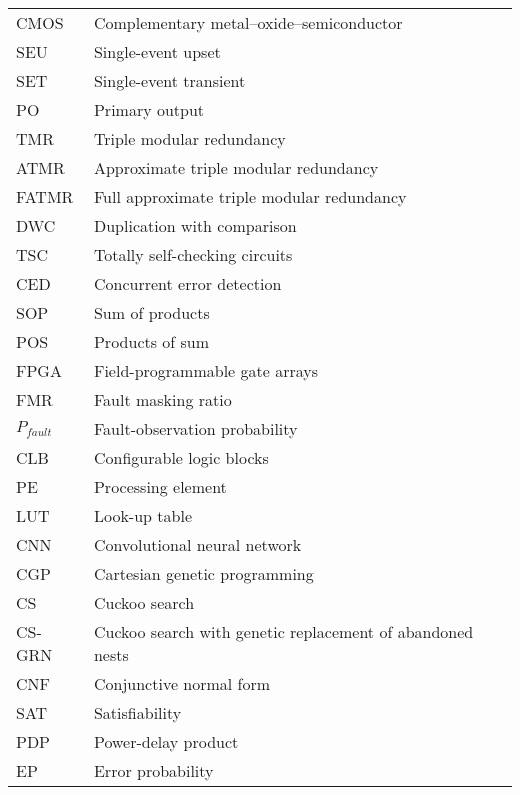 \begin{table}[h!]
    \captionsetup{labelformat=empty}
    \begin{tabular}{ll} %
      CMOS				&			Complementary metal–oxide–semiconductor \\
	  SEU			    &		    Single-event upset\\
	  SET		    	&			Single-event transient\\
	  PO			    &			Primary output \\			
      TMR				&			Triple modular redundancy\\
      ATMR              &           Approximate triple modular redundancy\\
      FATMR             &           Full approximate triple modular redundancy\\
      DWC 				& 			Duplication with comparison\\
      TSC		 		& 			Totally self-checking circuits\\
      CED		 		& 			Concurrent error detection\\
      SOP               &           Sum of products\\
      POS               &           Products of sum\\
      FPGA              &           Field-programmable gate arrays\\
      FMR               &           Fault masking ratio\\
      $P_{fault}$       &           Fault-observation probability\\
      CLB               &           Configurable logic blocks\\
      PE                &           Processing element\\
      LUT               &           Look-up table\\
      CNN               &           Convolutional neural network\\
      CGP               &           Cartesian genetic programming\\
      CS                &           Cuckoo search\\
      CS-GRN            &           Cuckoo search with genetic replacement of abandoned nests\\
      CNF               &           Conjunctive normal form\\
      SAT               &           Satisfiability\\
      PDP               &           Power-delay product\\
      EP                &           Error probability\\

    \end{tabular}
\end{table}
\pagebreak



